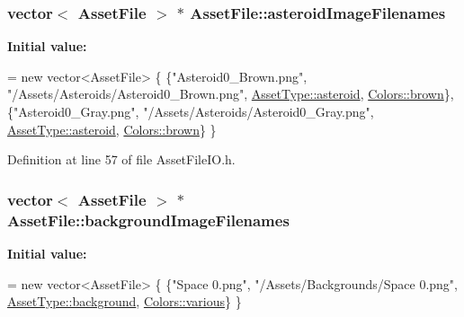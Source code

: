 \hypertarget{struct_asset_file_a7482e097719d1baa3a15fc3a5a00e15e}{
\subsubsection[{asteroid\-Image\-Filenames}]{\setlength{\rightskip}{0pt plus 5cm}vector$<$ {\bf Asset\-File} $>$ $\ast$ Asset\-File\-::asteroid\-Image\-Filenames\hspace{0.3cm}{\ttfamily [static]}}}\label{struct_asset_file_a7482e097719d1baa3a15fc3a5a00e15e}
{\bfseries Initial value\-:}
\begin{DoxyCode}
= \textcolor{keyword}{new} vector<AssetFile> \{
    \{\textcolor{stringliteral}{"Asteroid0\_Brown.png"}, \textcolor{stringliteral}{"/Assets/Asteroids/Asteroid0\_Brown.png"}, 
      \hyperlink{_asset_file_i_o_8h_a72d924d1cb8e1544b6d5198e98d52ca9acd76adfdb0f7227ec28f6dc8d0cb3221}{AssetType::asteroid}, \hyperlink{_character_data_8h_a55ecd4f2ec2ebfe8d5b0163e4ac2a967a6ff47afa5dc7daa42cc705a03fca8a9b}{Colors::brown}\},
    \{\textcolor{stringliteral}{"Asteroid0\_Gray.png"},  \textcolor{stringliteral}{"/Assets/Asteroids/Asteroid0\_Gray.png"},  
      \hyperlink{_asset_file_i_o_8h_a72d924d1cb8e1544b6d5198e98d52ca9acd76adfdb0f7227ec28f6dc8d0cb3221}{AssetType::asteroid}, \hyperlink{_character_data_8h_a55ecd4f2ec2ebfe8d5b0163e4ac2a967a6ff47afa5dc7daa42cc705a03fca8a9b}{Colors::brown}\}
\}
\end{DoxyCode}


Definition at line 57 of file Asset\-File\-I\-O.\-h.

\hypertarget{struct_asset_file_a54cd19685e8f404021aeef79eb775430}{
\subsubsection[{background\-Image\-Filenames}]{\setlength{\rightskip}{0pt plus 5cm}vector$<$ {\bf Asset\-File} $>$ $\ast$ Asset\-File\-::background\-Image\-Filenames\hspace{0.3cm}{\ttfamily [static]}}}\label{struct_asset_file_a54cd19685e8f404021aeef79eb775430}
{\bfseries Initial value\-:}
\begin{DoxyCode}
= \textcolor{keyword}{new} vector<AssetFile> \{
    \{\textcolor{stringliteral}{"Space 0.png"}, \textcolor{stringliteral}{"/Assets/Backgrounds/Space 0.png"}, \hyperlink{_asset_file_i_o_8h_a72d924d1cb8e1544b6d5198e98d52ca9ad229bbf31eaeebc7c88897732d8b932d}{AssetType::background}, 
      \hyperlink{_character_data_8h_a55ecd4f2ec2ebfe8d5b0163e4ac2a967a16875aa2b5eed3e388dcceaa36f56214}{Colors::various}\}
\}
\end{DoxyCode}


